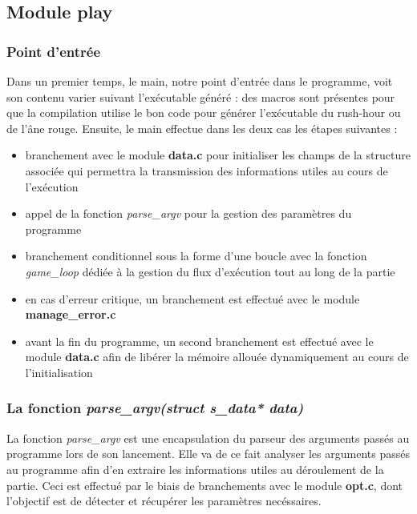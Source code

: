 \documentclass{report}
\begin{document}
\subsection{Module play}
\subsubsection*{Point d'entrée}
Dans un premier temps, le main, notre point d'entrée dans le programme, voit son contenu varier suivant l'exécutable généré : des macros sont présentes pour que la compilation utilise le bon code pour générer l'exécutable du rush-hour ou de l'âne rouge.
Ensuite, le main effectue dans les deux cas les étapes suivantes :
\begin{itemize}
\item branchement avec le module \textbf{data.c} pour initialiser les champs de la structure associée qui permettra la transmission des informations utiles au cours de l'exécution 
\item appel de la fonction \textit{parse\_argv} pour la gestion des paramètres du programme 
\item branchement conditionnel sous la forme d'une boucle avec la fonction \textit{game\_loop} dédiée à la gestion du flux d'exécution tout au long de la partie 
\item en cas d'erreur critique, un branchement est effectué avec le module \textbf{manage\_error.c} 
\item avant la fin du programme, un second branchement est effectué avec le module \textbf{data.c} afin de libérer la mémoire allouée dynamiquement au cours de l'initialisation
\end{itemize}
\subsubsection*{La fonction \textit{parse\_argv(struct s\_data* data)}}
La fonction \textit{parse\_argv} est une encapsulation du parseur des arguments passés au programme lors de son lancement.
Elle va de ce fait analyser les arguments passés au programme afin d'en extraire les informations utiles au déroulement de la partie.
Ceci est effectué par le biais de branchements avec le module \textbf{opt.c}, dont l'objectif est de détecter et récupérer les paramètres necéssaires.
\end{document}
